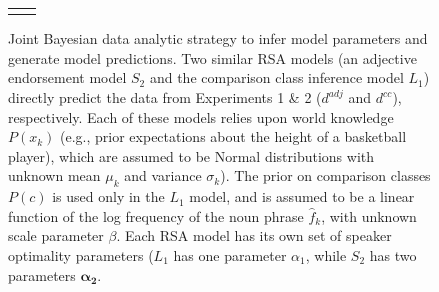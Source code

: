 \documentclass[doc]{apa6}
\begin{document}
\begin{figure}[ht]
\begin{center}
\begin{tabular}{cc}
\begin{tikzpicture}
    




%


\end{tikzpicture}

    \end{tabular}
  \end{center}
  \caption{Joint Bayesian data analytic strategy to infer model parameters and generate model predictions. Two similar RSA models (an adjective endorsement model $S_2$ and the comparison class inference model $L_1$) directly predict the data from Experiments 1 \& 2 ($d^{adj}$ and $d^{cc}$), respectively. Each of these models relies upon world knowledge $P(x_k)$ (e.g., prior expectations about the height of a basketball player), which are assumed to be Normal distributions with unknown mean $\mu_k$ and variance $\sigma_k$). The prior on comparison classes $P(c)$ is used only in the $L_1$ model, and is assumed to be a linear function of the log frequency of the noun phrase $\hat{f}_k$, with unknown scale parameter $\beta$. Each RSA model has its own set of speaker optimality parameters ($L_1$ has one parameter $\alpha_1$, while $S_2$ has two parameters $\boldsymbol{\alpha_2}$.}
  \label{fig:bayesnet}
\end{figure}





%
%
%
\end{document}
